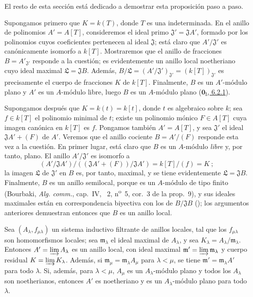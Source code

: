 El resto de esta sección está dedicado a demostrar esta proposición paso a paso.
\begin{env}[10.3.1.1]
\label{0.10.3.1.1}
\label{0.10.3.1.1-fr}
Supongamos primero que $K=k(T)$, donde $T$ es una indeterminada.
En el anillo de polinomios $A'=A[T]$, consideremos el ideal primo $\mathfrak J'=\mathfrak J A'$, formado por los
polinomios cuyos coeficientes pertenecen al ideal $\mathfrak J$;
está claro que $A'/\mathfrak J'$ es canónicamente isomorfo a $k[T]$.
Mostraremos que el anillo de fracciones $B=A'_{\mathfrak J'}$ responde a la cuestión; es evidentemente un anillo local noetheriano cuyo ideal maximal $\mathfrak L=\mathfrak J B$.
Además, $B/\mathfrak L=(A'/\mathfrak J')_{\mathfrak J'}=(k[T])_{\mathfrak J'}$ es precisamente el cuerpo de fracciones $K$ de $k[T]$.
Finalmente, $B$ es un $A'$-módulo plano y $A'$ es un $A$-módulo libre, luego $B$ es un $A$-módulo plano (\hyperref[0.6.2.1-fr]{$\mathbf{0}_{\mathrm I}$, 6.2.1}).
\end{env}

\begin{env}[10.3.1.2]
\label{0.10.3.1.2-fr}
Supongamos después que $K=k(t)=k[t]$, donde $t$ es algebraico sobre $k$;
sea $f\in k[T]$ el polinomio minimal de $t$;
existe un polinomio mónico $F\in A[T]$ cuya imagen canónica en $k[T]$ es $f$. Pongamos también $A'=A[T]$, y sea $\mathfrak J'$ el ideal $\mathfrak J A'+(F)$ de $A'$.
Veremos que el anillo cociente $B=A'/(F)$ responde esta vez a la cuestión. En primer lugar, está claro que $B$ es un $A$-módulo \emph{libre} y, por tanto, plano.
El anillo $A'/\mathfrak J'$ es isomorfo a
\[
  (A'/\mathfrak J A')/((\mathfrak J A'+(F))/\mathfrak J A')
  =k[T]/(f)=K~;
\]
la imagen $\mathfrak L$ de $\mathfrak J'$ en $B$ es, por tanto, maximal, y se tiene evidentemente $\mathfrak L=\mathfrak J B$.
Finalmente, $B$ es un anillo semilocal, porque es un $A$-módulo de tipo finito (Bourbaki, \emph{Alg. comm.}, cap.~IV, \textsection~2, n\textsuperscript{o}~5, cor.~3 de la prop.~9), y sus ideales maximales están en correspondencia biyectiva con los de $B/\mathfrak J B$ (\cite[vol.~I, p.~259]{I-13});
los argumentos anteriores demuestran entonces que $B$ es un anillo local.
\end{env}

\begin{lemma}[10.3.1.3]
\label{0.10.3.1.3}
\label{0.10.3.1.3-fr}
Sea $(A_\lambda,f_{\mu\lambda})$ un sistema inductivo filtrante de anillos locales, tal que los $f_{\mu\lambda}$ son homomorfismos locales;
sea $\mathfrak m_\lambda$ el ideal maximal de $A_\lambda$, y sea $K_\lambda=A_\lambda/\mathfrak m_\lambda$.
Entonces $A'=\varinjlim A_\lambda$ es un anillo local, con ideal maximal $\mathfrak m'=\varinjlim\mathfrak m_\lambda$ y cuerpo residual $K=\varinjlim K_\lambda$.
Además, si $\mathfrak m_\mu=\mathfrak m_\lambda A_\mu$ para $\lambda<\mu$, se tiene $\mathfrak m'=\mathfrak m_\lambda A'$ para todo $\lambda$.
Si, además, para $\lambda<\mu$,
$A_\mu$ es un $A_\lambda$-módulo plano y todos los $A_\lambda$ son noetherianos, entonces $A'$ es noetheriano y es un $A_\lambda$-módulo plano para todo $\lambda$.
\end{lemma}



